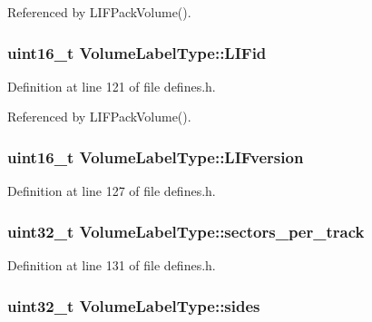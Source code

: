 Referenced by L\+I\+F\+Pack\+Volume().

\subsubsection[{\texorpdfstring{L\+I\+Fid}{LIFid}}]{\setlength{\rightskip}{0pt plus 5cm}uint16\+\_\+t Volume\+Label\+Type\+::\+L\+I\+Fid}\hypertarget{structVolumeLabelType_a16bdde2d19114ac3238477c29fe75b4a}{}\label{structVolumeLabelType_a16bdde2d19114ac3238477c29fe75b4a}


Definition at line 121 of file defines.\+h.



Referenced by L\+I\+F\+Pack\+Volume().

\subsubsection[{\texorpdfstring{L\+I\+Fversion}{LIFversion}}]{\setlength{\rightskip}{0pt plus 5cm}uint16\+\_\+t Volume\+Label\+Type\+::\+L\+I\+Fversion}\hypertarget{structVolumeLabelType_a2aba13e38e43a590f909ab94d74a74ff}{}\label{structVolumeLabelType_a2aba13e38e43a590f909ab94d74a74ff}


Definition at line 127 of file defines.\+h.

\subsubsection[{\texorpdfstring{sectors\+\_\+per\+\_\+track}{sectors_per_track}}]{\setlength{\rightskip}{0pt plus 5cm}uint32\+\_\+t Volume\+Label\+Type\+::sectors\+\_\+per\+\_\+track}\hypertarget{structVolumeLabelType_a0014a4795dfcf4117212bba590fc889e}{}\label{structVolumeLabelType_a0014a4795dfcf4117212bba590fc889e}


Definition at line 131 of file defines.\+h.

\subsubsection[{\texorpdfstring{sides}{sides}}]{\setlength{\rightskip}{0pt plus 5cm}uint32\+\_\+t Volume\+Label\+Type\+::sides}\hypertarget{structVolumeLabelType_ac1e0f088685c022ec1974cb6fa4d255c}{}\label{structVolumeLabelType_ac1e0f088685c022ec1974cb6fa4d255c}


